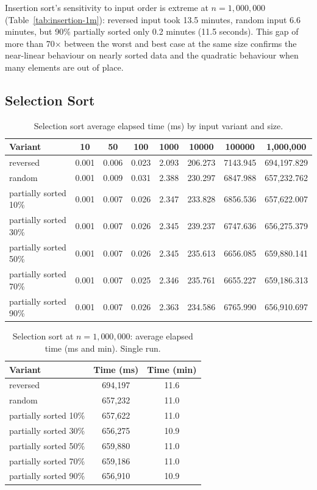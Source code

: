 \documentclass[11pt,a4paper]{article}
\begin{document}
Insertion sort's sensitivity to input order is extreme at \(n=1{,}000{,}000\) (Table~\ref{tab:insertion-1m}): reversed input took 13.5 minutes, random input 6.6 minutes, but 90\% partially sorted only 0.2 minutes (11.5 seconds). This gap of more than 70$\times$ between the worst and best case at the same size confirms the near-linear behaviour on nearly sorted data and the quadratic behaviour when many elements are out of place.

\subsection{Selection Sort}
\begin{table}[H]
\centering
\footnotesize
\begin{tabular}{lccccccc}
\toprule
Variant & 10 & 50 & 100 & 1000 & 10000 & 100000 & 1{,}000{,}000 \\
\midrule
reversed & 0.001 & 0.006 & 0.023 & 2.093 & 206.273 & 7143.945 & 694{,}197.829 \\
random & 0.001 & 0.009 & 0.031 & 2.388 & 230.297 & 6847.988 & 657{,}232.762 \\
partially sorted 10\% & 0.001 & 0.007 & 0.026 & 2.347 & 233.828 & 6856.536 & 657{,}622.007 \\
partially sorted 30\% & 0.001 & 0.007 & 0.026 & 2.345 & 239.237 & 6747.636 & 656{,}275.379 \\
partially sorted 50\% & 0.001 & 0.007 & 0.026 & 2.345 & 235.613 & 6656.085 & 659{,}880.141 \\
partially sorted 70\% & 0.001 & 0.007 & 0.025 & 2.346 & 235.761 & 6655.227 & 659{,}186.313 \\
partially sorted 90\% & 0.001 & 0.007 & 0.026 & 2.363 & 234.586 & 6765.990 & 656{,}910.697 \\
\bottomrule
\end{tabular}
\caption{Selection sort average elapsed time (ms) by input variant and size.}
\label{tab:selection-results}
\end{table}

\begin{table}[H]
\centering
\begin{tabular}{lcc}
\toprule
Variant & Time (ms) & Time (min) \\
\midrule
reversed & 694{,}197 & 11.6 \\
random & 657{,}232 & 11.0 \\
partially sorted 10\% & 657{,}622 & 11.0 \\
partially sorted 30\% & 656{,}275 & 10.9 \\
partially sorted 50\% & 659{,}880 & 11.0 \\
partially sorted 70\% & 659{,}186 & 11.0 \\
partially sorted 90\% & 656{,}910 & 10.9 \\
\bottomrule
\end{tabular}
\caption{Selection sort at \(n=1{,}000{,}000\): average elapsed time (ms and min). Single run.}
\label{tab:selection-1m}
\end{table}
\end{document}

